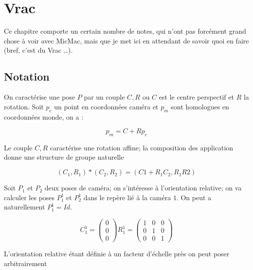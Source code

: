 \chapter{Vrac}

Ce chapitre comporte un certain nombre de notes, qui n'ont
pas forc\'ement grand chose \`a voir avec MicMac, mais
que je met ici en attendant de savoir quoi en faire (bref,
c'est du Vrac \dots).


\section{Notation}

On caract\'erise une pose $P$ par un couple $C,R$ ou $C$ est le centre
perspectif et $R$ la rotation. Soit $p_c$ un point en coordonn\'ees
cam\'era et $p_m$ sont homologues en coordonn\'ees monde, on a :

\begin{equation}
   p_m = C + R p_c
\end{equation}

Le couple $C,R$  caract\'erise une rotation affine; la composition
des application donne une structure de groupe naturelle

\begin{equation}
   (C_1,R_1) * (C_2,R_2) = (C1+R_1C_2,R_1R2)
\end{equation}

Soit $P_1$ et $P_2$ deux poses de cam\'era; on s'int\'eresse \`a l'orientation
relative; on va calculer les poses $P^1_1$ et $P^1_2$  dans le rep\`ere li\'e \`a la cam\'era 
$1$.  On peut  a naturellement  $P^1_1=Id$.

\begin{equation}
   C^1_1 = \begin{pmatrix} 0 \\ 0  \\ 0 \end{pmatrix}
   R^1_1 = \begin{pmatrix} 1 &  0  & 0 \\ 0  & 1 &  0   \\ 0 & 0 & 1 \end{pmatrix}
 \end{equation}


L'orientation relative \'etant d\'efinie \`a un facteur d'\'echelle pr\`es 
on peut  poser arbitrairement

